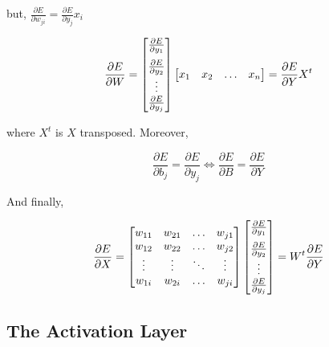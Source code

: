 \documentclass{article}
\begin{document}
\noindent but, $\frac{\partial E}{\partial w_{ji}} = \frac{\partial E}{\partial y_j}x_i$

\begin{equation}
	\displaystyle\frac{\partial E}{\partial W} = 
	\begin{bmatrix}
		\frac{\partial E}{\partial y_1} 
		\vspace{0.2cm} \\
		\frac{\partial E}{\partial y_2} \\
		\vdots \\
		\frac{\partial E}{\partial y_j}
	\end{bmatrix}
	\begin{bmatrix}
		x_1 & x_2 & \dots & x_n 
	\end{bmatrix} = \displaystyle\frac{\partial E}{\partial Y}X^t
	\label{eq:errorwrtweightsandbiases}
\end{equation}

\noindent where $X^t$ is $X$ transposed. Moreover,

\begin{equation}
	\frac{\partial E}{\partial b_j} = \frac{\partial E}{\partial y_j} \iff 
	\frac{\partial E}{\partial B} = \frac{\partial E}{\partial Y}
	\label{eq:errorwrtbias}
\end{equation}

\noindent And finally,

\begin{equation}
	\frac{\partial E}{\partial X}=\begin{bmatrix}
		w_{11} & w_{21} & \dots & w_{j1} \\
		w_{12} & w_{22} & \dots & w_{j2} \\
		\vdots & \vdots & \ddots & \vdots \\
		w_{1i} & w_{2i} & \dots & w_{ji}
	\end{bmatrix}
	\begin{bmatrix}
		\frac{\partial E}{\partial y_1} 
		\vspace{0.2cm} \\
		\frac{\partial E}{\partial y_2} \\
		\vdots \\
		\frac{\partial E}{\partial y_j}
	\end{bmatrix} = W^t\displaystyle\frac{\partial E}{\partial Y}
	\label{eq:errorwrtoutput}
\end{equation}

\pagebreak

\subsection{The Activation Layer}
\end{document}
